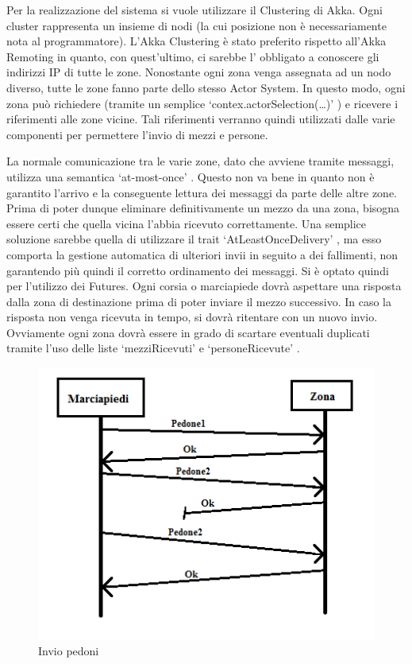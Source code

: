 \documentclass{article}
\begin{document}
\lettrine[lines=1]{P}{}er la realizzazione del sistema si vuole utilizzare il Clustering di Akka. Ogni cluster rappresenta un insieme di nodi (la cui posizione non \`{e} necessariamente nota al programmatore). L\textquoteright{}Akka Clustering \`{e} stato preferito rispetto all\textquoteright{}Akka Remoting in quanto, con quest\textquoteright{}ultimo, ci sarebbe l\textquoteright{} obbligato a conoscere gli indirizzi IP di tutte le zone. Nonostante ogni zona venga assegnata ad un nodo diverso, tutte le zone fanno parte dello stesso Actor System. In questo modo, ogni zona pu\`{o} richiedere (tramite un semplice \lq contex.actorSelection(…)\rq{} ) e ricevere i riferimenti alle zone vicine. Tali riferimenti verranno quindi utilizzati dalle varie componenti per permettere l\textquoteright{}invio di mezzi e persone.
\par La normale comunicazione tra le varie zone, dato che avviene tramite messaggi, utilizza una semantica \lq at-most-once\rq{} . Questo non va bene in quanto non \`{e} garantito l\textquoteright{}arrivo e la conseguente lettura dei messaggi da parte delle altre zone. Prima di poter dunque eliminare definitivamente un mezzo da una zona, bisogna essere certi che quella vicina l\textquoteright{}abbia ricevuto correttamente. Una semplice soluzione sarebbe quella di utilizzare il trait \lq AtLeastOnceDelivery\rq{} , ma esso comporta la gestione automatica di ulteriori invii in seguito a dei fallimenti, non garantendo pi\`{u} quindi il corretto ordinamento dei messaggi. Si \`{e} optato quindi per l\textquoteright{}utilizzo dei Futures. Ogni corsia o marciapiede dovr\`{a} aspettare una risposta dalla zona di destinazione prima di poter inviare il mezzo successivo. In caso la risposta non venga ricevuta in tempo, si dovr\`{a} ritentare con un nuovo invio. Ovviamente ogni zona dovr\`{a} essere in grado di scartare eventuali duplicati tramite l\textquoteright{}uso delle liste \lq mezziRicevuti\rq{} e \lq personeRicevute\rq{} . 
\begin{figure}[H]
\begin{center}
\includegraphics{./img/Protocollo.png}
\caption{Invio pedoni}
\label{fig:Invio pedoni}
\end{center}
\end{figure}
\end{document}
